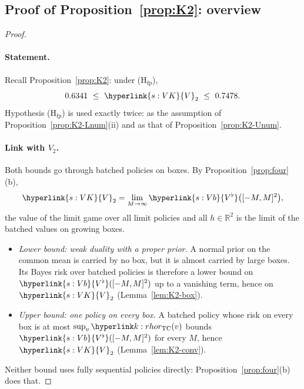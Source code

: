 \documentclass[11pt]{article}
\DeclareRobustCommand{\sy}[2]{{\hyperlink{#1}{#2}}}
\newcommand{\R}{\mathbb{R}}
\newcommand{\1}{\mathbf{1}}
\newcommand{\VK}{\sy{s:VK}{V}}
\newcommand{\Vb}{\sy{s:Vb}{V^\flat}}
\begin{document}
\subsection{Proof of Proposition~\ref{prop:K2}: overview}\label{sec:K2-proof}
\begin{proof}
\paragraph{Statement.} Recall Proposition~\ref{prop:K2}: under (H$_{\mathrm{fp}}$),
\[
0.6341\ \le\ \VK_2\ \le\ 0.7478 .
\]
Hypothesis (H$_{\mathrm{fp}}$) is used exactly twice: as the assumption of Proposition~\ref{prop:K2-Lnum}(ii) and as that of Proposition~\ref{prop:K2-Unum}.

\paragraph{Link with $V_2$.} Both bounds go through batched policies on boxes. By Proposition~\ref{prop:four}(b),
\[
\VK_2=\lim_{M\to\infty}\Vb\big([-M,M]^2\big),
\]
the value of the limit game over all limit policies and all $h\in\R^2$ is the limit of the batched values on growing boxes.
\begin{itemize}
\item \emph{Lower bound: weak duality with a proper prior.} A normal prior on the common mean is carried by no box, but it is almost carried by large boxes. Its Bayes
risk over batched policies is therefore a lower bound on $\Vb([-M,M]^2)$ up to a vanishing term, hence on $\VK_2$ (Lemma~\ref{lem:K2-box}).
\item \emph{Upper bound: one policy on every box.} A batched policy whose risk on every box is at most $\sup_v\kr(v)$ bounds $\Vb([-M,M]^2)$ for every $M$, hence $\VK_2$
(Lemma~\ref{lem:K2-conv}).
\end{itemize}
Neither bound uses fully sequential policies directly: Proposition~\ref{prop:four}(b) does that.


\end{proof}
\end{document}
